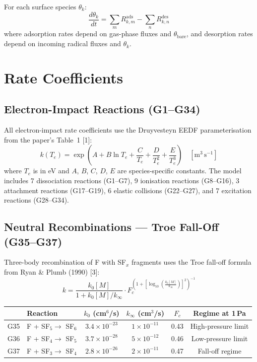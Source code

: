 \documentclass[11pt,a4paper]{article}
\begin{document}
For each surface species $\theta_k$:
\begin{equation}
\frac{d\theta_k}{dt} = \sum_m R^\text{ads}_{k,m} - \sum_n R^\text{des}_{k,n}
\end{equation}
where adsorption rates depend on gas-phase fluxes and $\theta_\text{bare}$, and desorption rates depend on incoming radical fluxes and $\theta_k$.

\section{Rate Coefficients}

\subsection{Electron-Impact Reactions (G1--G34)}

All electron-impact rate coefficients use the Druyvesteyn EEDF parameterisation from the paper's Table~1 [1]:
\begin{equation}\label{eq:krate}
\boxed{k(T_e) = \exp\!\left(A + B\ln T_e + \frac{C}{T_e} + \frac{D}{T_e^2} + \frac{E}{T_e^3}\right) \quad [\text{m}^3\,\text{s}^{-1}]}
\end{equation}
where $T_e$ is in eV and $A$, $B$, $C$, $D$, $E$ are species-specific constants. The model includes 7 dissociation reactions (G1--G7), 9 ionisation reactions (G8--G16), 3 attachment reactions (G17--G19), 6 elastic collisions (G22--G27), and 7 excitation reactions (G28--G34).

\subsection{Neutral Recombinations --- Troe Fall-Off (G35--G37)}

Three-body recombination of F with SF$_x$ fragments uses the Troe fall-off formula from Ryan \& Plumb (1990) [3]:
\begin{equation}\label{eq:troe}
\boxed{k = \frac{k_0[M]}{1 + k_0[M]/k_\infty} \cdot F_c^{\left(1 + \left[\log_{10}\!\left(\frac{k_0[M]}{k_\infty}\right)\right]^2\right)^{-1}}}
\end{equation}

\begin{table}[H]
\centering
\begin{tabular}{clcccc}
\toprule
& \textbf{Reaction} & $k_0$ (cm$^6$/s) & $k_\infty$ (cm$^3$/s) & $F_c$ & \textbf{Regime at 1\,Pa} \\
\midrule
G35 & F + SF$_5 \to$ SF$_6$ & $3.4\times10^{-23}$ & $1\times10^{-11}$ & 0.43 & High-pressure limit \\
G36 & F + SF$_4 \to$ SF$_5$ & $3.7\times10^{-28}$ & $5\times10^{-12}$ & 0.46 & Low-pressure limit \\
G37 & F + SF$_3 \to$ SF$_4$ & $2.8\times10^{-26}$ & $2\times10^{-11}$ & 0.47 & Fall-off regime \\
\bottomrule
\end{tabular}
\end{table}
\end{document}
